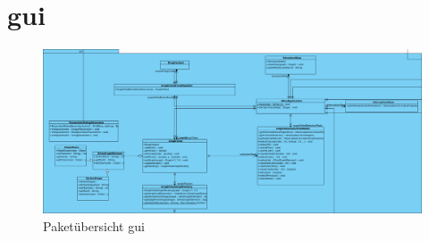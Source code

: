 \newpage

\section{gui}

\begin{figure}[hb]
  \centering
  \includegraphics[width=380pt]{resourcen/gui.png}
  \caption{Paketübersicht gui}
  \label{fig:packge_gui}
\end{figure}

